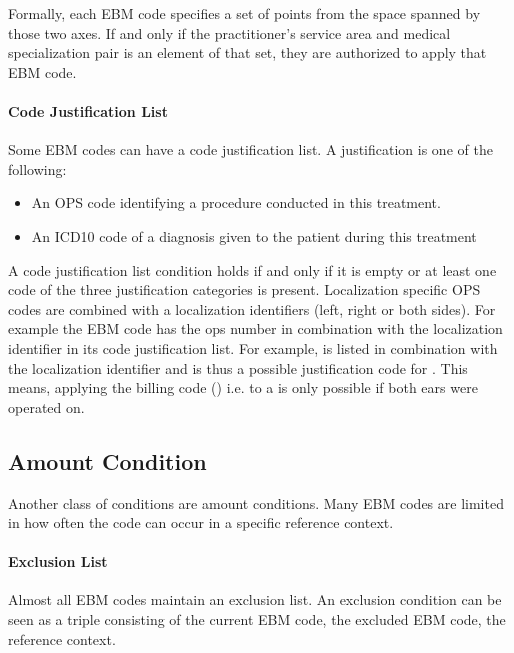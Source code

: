 Formally, each EBM code specifies a set of points from the space spanned by those two axes.
If and only if the practitioner's service area and medical specialization pair is an element of that set, they are authorized to apply that EBM code.


\paragraph{Code Justification List}
Some EBM codes can have a code justification list.
A justification is one of the following:
\begin{itemize}
    \item An OPS code identifying a procedure conducted in this treatment.
    \item An ICD10 code of a diagnosis given to the patient during this treatment
\end{itemize}
A code justification list condition holds if and only if it is empty or at least one code of the three justification categories is present.
Localization specific OPS codes are combined with a localization identifiers (left, right or both sides).
For example the EBM code  has the ops number  in combination with the  localization identifier in its code justification list.
For example,  is listed in combination with the  localization identifier and is thus a possible justification code for .
This means, applying the billing code  () i.e.  to a  is only possible if both ears were operated on.

\subsection{Amount Condition}
Another class of conditions are amount conditions.
Many EBM codes are limited in how often the code can occur in a specific reference context.

\paragraph{Exclusion List}\label{subsec:exclusion-list}
Almost all EBM codes maintain an exclusion list.
An exclusion condition can be seen as a triple consisting of the current EBM code, the excluded EBM code, the reference context.

